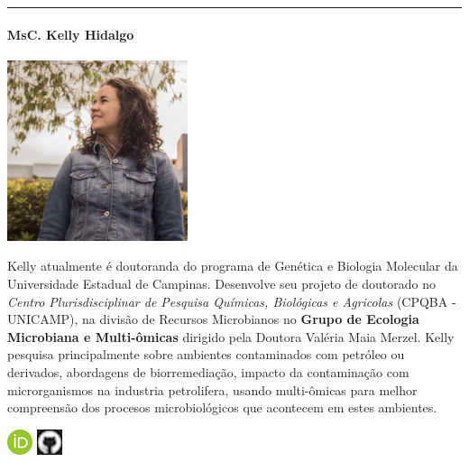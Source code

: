 \documentclass[
]{book}
\begin{document}
\begin{center}\rule{0.5\linewidth}{0.5pt}\end{center}

\hypertarget{msc.-kelly-hidalgo}{%
\paragraph*{MsC. Kelly Hidalgo}\label{msc.-kelly-hidalgo}}

\begin{center}\includegraphics[width=0.4\linewidth,height=0.4\textheight]{imgs/KellyHidalgo} \end{center}

Kelly atualmente é doutoranda do programa de Genética e Biologia Molecular da Universidade Estadual de Campinas. Desenvolve seu projeto de doutorado no \emph{Centro Plurisdisciplinar de Pesquisa Químicas, Biológicas e Agricolas} (CPQBA - UNICAMP), na divisão de Recursos Microbianos no \textbf{Grupo de Ecologia Microbiana e Multi-ômicas} dirigido pela Doutora Valéria Maia Merzel.
Kelly pesquisa principalmente sobre ambientes contaminados com petróleo ou derivados, abordagens de biorremediação, impacto da contaminação com microrganismos na industria petrolifera, usando multi-ômicas para melhor compreensão dos procesos microbiológicos que acontecem em estes ambientes.

\href{https://orcid.org/0000-0003-4607-3750}{\includegraphics{imgs/orcid.png}} \href{https://github.com/khidalgo85}{\includegraphics{imgs/github.png}}

  
\end{document}
